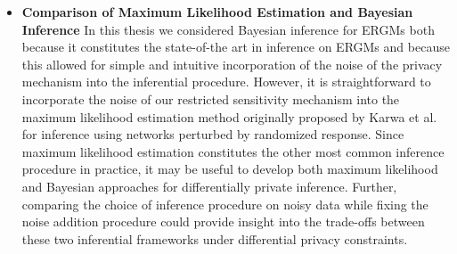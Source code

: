 \begin{itemize}
	\item \textbf{Comparison of Maximum Likelihood Estimation and Bayesian Inference} In this thesis we considered Bayesian inference for ERGMs both because it constitutes the state-of-the art in inference on ERGMs and because this allowed for simple and intuitive incorporation of the noise of the privacy mechanism into the inferential procedure. However, it is straightforward to incorporate the noise of our restricted sensitivity mechanism into the maximum likelihood estimation method originally proposed by Karwa et al. \cite{KKS17} for inference using networks perturbed by randomized response. Since maximum likelihood estimation constitutes the other most common inference procedure in practice, it may be useful to develop both maximum likelihood and Bayesian approaches for differentially private inference. Further, comparing the choice of inference procedure on noisy data while fixing the noise addition procedure could provide insight into the trade-offs between these two inferential frameworks under differential privacy constraints.
\end{itemize}